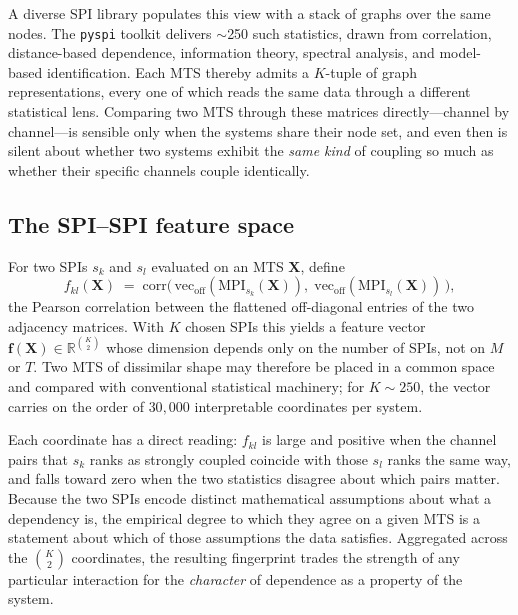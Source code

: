 \documentclass{article}
\theoremstyle{plain}
\theoremstyle{definition}
\theoremstyle{remark}
\begin{document}
A diverse SPI library populates this view with a stack of graphs over the same nodes. The \texttt{pyspi} toolkit \citep{cliff2023unifying} delivers $\sim$250 such statistics, drawn from correlation, distance-based dependence, information theory, spectral analysis, and model-based identification. Each MTS thereby admits a $K$-tuple of graph representations, every one of which reads the same data through a different statistical lens. Comparing two MTS through these matrices directly---channel by channel---is sensible only when the systems share their node set, and even then is silent about whether two systems exhibit the \emph{same kind} of coupling so much as whether their specific channels couple identically.

\subsection{The SPI--SPI feature space}
\label{sec:method-fij}

For two SPIs $s_k$ and $s_l$ evaluated on an MTS $\mathbf{X}$, define
\begin{equation}
\label{eq:fij}
f_{kl}(\mathbf{X}) \;=\; \mathrm{corr}\!\bigl(\,
\mathrm{vec}_{\text{off}}(\mathrm{MPI}_{s_k}(\mathbf{X})),\;
\mathrm{vec}_{\text{off}}(\mathrm{MPI}_{s_l}(\mathbf{X}))
\,\bigr),
\end{equation}
the Pearson correlation between the flattened off-diagonal entries of the two adjacency matrices. With $K$ chosen SPIs this yields a feature vector $\mathbf{f}(\mathbf{X}) \in \mathbb{R}^{K \choose 2}$ whose dimension depends only on the number of SPIs, not on $M$ or $T$. Two MTS of dissimilar shape may therefore be placed in a common space and compared with conventional statistical machinery; for $K \sim 250$, the vector carries on the order of $30{,}000$ interpretable coordinates per system.

Each coordinate has a direct reading: $f_{kl}$ is large and positive when the channel pairs that $s_k$ ranks as strongly coupled coincide with those $s_l$ ranks the same way, and falls toward zero when the two statistics disagree about which pairs matter. Because the two SPIs encode distinct mathematical assumptions about what a dependency is, the empirical degree to which they agree on a given MTS is a statement about which of those assumptions the data satisfies. Aggregated across the ${K \choose 2}$ coordinates, the resulting fingerprint trades the strength of any particular interaction for the \emph{character} of dependence as a property of the system.
\end{document}
